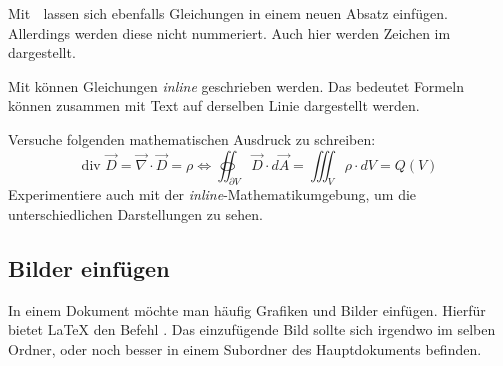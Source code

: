 Mit \befehl{[}$\; $\befehl{]} lassen sich ebenfalls Gleichungen in einem neuen Absatz einfügen. Allerdings werden diese nicht nummeriert. Auch hier werden Zeichen im  dargestellt.

Mit \umgebung{\$ \$} können Gleichungen \textit{inline} geschrieben werden. Das bedeutet Formeln können zusammen mit Text auf derselben Linie dargestellt werden. 
$ $

\begin{aufgabe}
	Versuche folgenden mathematischen Ausdruck zu schreiben:
	\[ \text{div } \vec{D} = \vec{\nabla} \cdot \vec{D} = \rho \Leftrightarrow \oiint_{\partial V}\vec{D}\cdot d\vec{A} = \iiint_V \rho \cdot dV = Q(V) \]
	Experimentiere auch mit der \textit{inline}-Mathematikumgebung, um die unterschiedlichen Darstellungen zu sehen. 
\end{aufgabe}

\subsection{Bilder einfügen}
In einem Dokument möchte man häufig Grafiken und Bilder einfügen. Hierfür bietet \LaTeX{} den Befehl . Das einzufügende Bild sollte sich irgendwo im selben Ordner, oder noch besser in einem Subordner des Hauptdokuments befinden.

